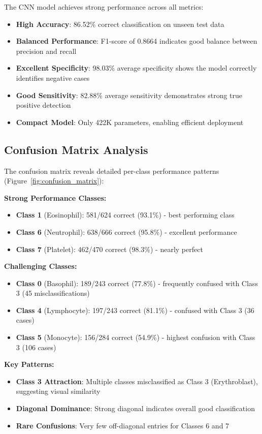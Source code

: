 \documentclass[runningheads]{llncs}
\begin{document}
The CNN model achieves strong performance across all metrics:
\begin{itemize}
    \item \textbf{High Accuracy}: 86.52\% correct classification on unseen test data
    \item \textbf{Balanced Performance}: F1-score of 0.8664 indicates good balance between precision and recall
    \item \textbf{Excellent Specificity}: 98.03\% average specificity shows the model correctly identifies negative cases
    \item \textbf{Good Sensitivity}: 82.88\% average sensitivity demonstrates strong true positive detection
    \item \textbf{Compact Model}: Only 422K parameters, enabling efficient deployment
\end{itemize}

\subsection{Confusion Matrix Analysis}

The confusion matrix reveals detailed per-class performance patterns (Figure~\ref{fig:confusion_matrix}):

\textbf{Strong Performance Classes:}
\begin{itemize}
    \item \textbf{Class 1} (Eosinophil): 581/624 correct (93.1\%) - best performing class
    \item \textbf{Class 6} (Neutrophil): 638/666 correct (95.8\%) - excellent performance
    \item \textbf{Class 7} (Platelet): 462/470 correct (98.3\%) - nearly perfect
\end{itemize}

\textbf{Challenging Classes:}
\begin{itemize}
    \item \textbf{Class 0} (Basophil): 189/243 correct (77.8\%) - frequently confused with Class 3 (45 misclassifications)
    \item \textbf{Class 4} (Lymphocyte): 197/243 correct (81.1\%) - confused with Class 3 (36 cases)
    \item \textbf{Class 5} (Monocyte): 156/284 correct (54.9\%) - highest confusion with Class 3 (106 cases)
\end{itemize}

\textbf{Key Patterns:}
\begin{itemize}
    \item \textbf{Class 3 Attraction}: Multiple classes misclassified as Class 3 (Erythroblast), suggesting visual similarity
    \item \textbf{Diagonal Dominance}: Strong diagonal indicates overall good classification
    \item \textbf{Rare Confusions}: Very few off-diagonal entries for Classes 6 and 7
\end{itemize}
\end{document}
